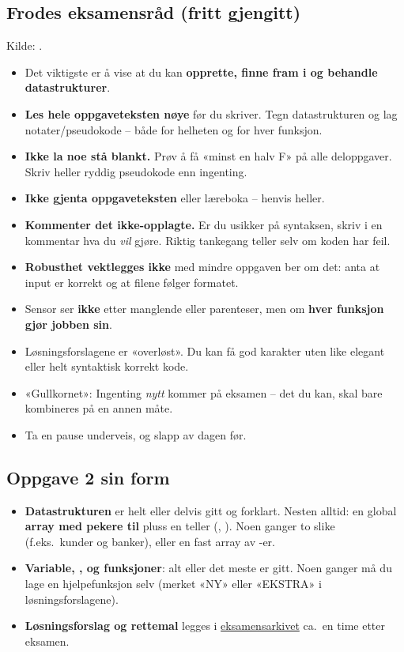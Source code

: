 \subsection{Frodes eksamensråd (fritt gjengitt)}
Kilde: \href{https://frh.folk.ntnu.no/grprog/ex_raad.html}{}.
\begin{frode}
\begin{itemize}
  \item Det viktigste er å vise at du kan \textbf{opprette, finne fram i og behandle datastrukturer}.
  \item \textbf{Les hele oppgaveteksten nøye} før du skriver. Tegn datastrukturen og lag notater/pseudokode -- både for helheten og for hver funksjon.
  \item \textbf{Ikke la noe stå blankt.} Prøv å få «minst en halv F» på alle deloppgaver. Skriv heller ryddig pseudokode enn ingenting.
  \item \textbf{Ikke gjenta oppgaveteksten} eller læreboka -- henvis heller.
  \item \textbf{Kommenter det ikke-opplagte.} Er du usikker på syntaksen, skriv i en kommentar hva du \emph{vil} gjøre. Riktig tankegang teller selv om koden har feil.
  \item \textbf{Robusthet vektlegges ikke} med mindre oppgaven ber om det: anta at input er korrekt og at filene følger formatet.
  \item Sensor ser \textbf{ikke} etter manglende \cc{;} eller parenteser, men om \textbf{hver funksjon gjør jobben sin}.
  \item Løsningsforslagene er «overløst». Du kan få god karakter uten like elegant eller helt syntaktisk korrekt kode.
  \item «Gullkornet»: Ingenting \emph{nytt} kommer på eksamen -- det du kan, skal bare kombineres på en annen måte.
  \item Ta en pause underveis, og slapp av dagen før.
\end{itemize}
\end{frode}

\subsection{Oppgave 2 sin form}
\begin{itemize}
  \item \textbf{Datastrukturen} er helt eller delvis gitt og forklart. Nesten alltid: en global \textbf{array med pekere til } pluss en teller (, ). Noen ganger to slike (f.eks.\ kunder og banker), eller en fast array av -er.
  \item \textbf{Variable, ,  og funksjoner}: alt eller det meste er gitt. Noen ganger må du lage en hjelpefunksjon selv (merket «NY» eller «EKSTRA» i løsningsforslagene).
  \item \textbf{Løsningsforslag og rettemal} legges i \href{https://frh.folk.ntnu.no/grprog/eksamen/}{eksamensarkivet} ca.\ en time etter eksamen.
\end{itemize}

